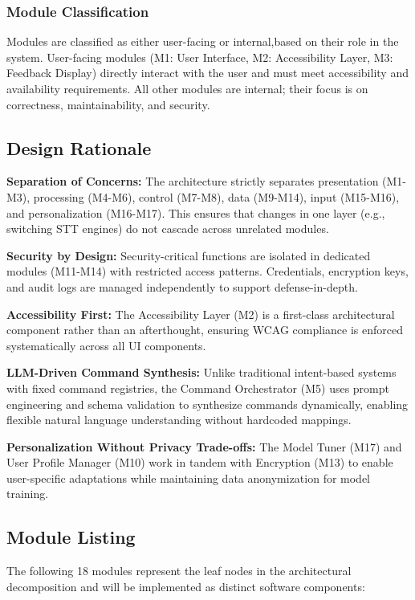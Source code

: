 \documentclass[12pt, titlepage]{article}
\begin{document}
\subsubsection*{Module Classification}

Modules are classified as either user-facing or internal,based on their role in the system. User-facing modules (M1: User Interface, M2: Accessibility Layer, M3: Feedback Display) directly interact with the user and must meet accessibility and availability requirements. All other modules are internal; their focus is on correctness, maintainability, and security.



\subsection{Design Rationale}

\textbf{Separation of Concerns:} The architecture strictly separates presentation (M1-M3), processing (M4-M6), control (M7-M8), data (M9-M14), input (M15-M16), and personalization (M16-M17). This ensures that changes in one layer (e.g., switching STT engines) do not cascade across unrelated modules.

\textbf{Security by Design:} Security-critical functions are isolated in dedicated modules (M11-M14) with restricted access patterns. Credentials, encryption keys, and audit logs are managed independently to support defense-in-depth.

\textbf{Accessibility First:} The Accessibility Layer (M2) is a first-class architectural component rather than an afterthought, ensuring WCAG compliance is enforced systematically across all UI components.

\textbf{LLM-Driven Command Synthesis:} Unlike traditional intent-based systems with fixed command registries, the Command Orchestrator (M5) uses prompt engineering and schema validation to synthesize commands dynamically, enabling flexible natural language understanding without hardcoded mappings.

\textbf{Personalization Without Privacy Trade-offs:} The Model Tuner (M17) and User Profile Manager (M10) work in tandem with Encryption (M13) to enable user-specific adaptations while maintaining data anonymization for model training.

\subsection{Module Listing}
The following 18 modules represent the leaf nodes in the architectural decomposition and will be implemented as distinct software components:
\end{document}
